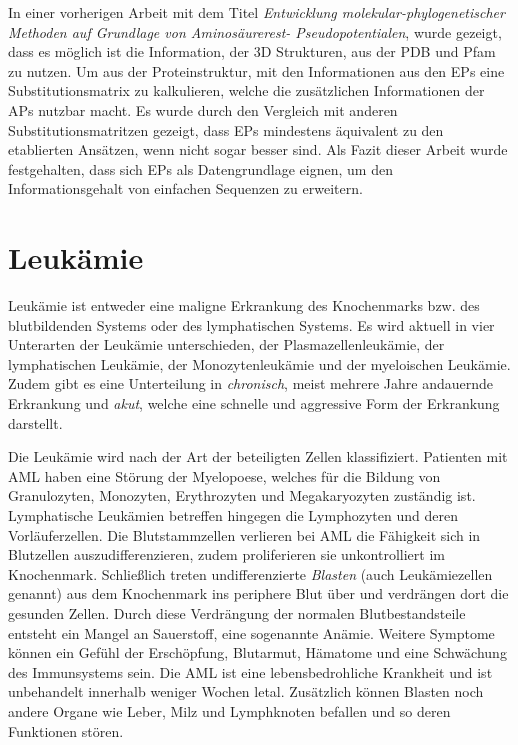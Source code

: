 In einer vorherigen Arbeit mit dem Titel \emph{Entwicklung mole\-kular-phylo\-genetisch\-er Methoden auf Grundlage von Aminosäurerest- Pseudopotentialen}, wurde gezeigt, dass es möglich ist die Information, der 3D Strukturen, aus der \ac{PDB} und \ac{Pfam} zu nutzen\cite{Mathias.2014}. Um aus der Proteinstruktur, mit den Informationen aus den EPs eine Substitutionsmatrix zu kalkulieren, welche die zusätzlichen Informationen der \ac{APs} nutzbar macht. Es wurde durch den Vergleich mit anderen Substitutionsmatritzen gezeigt, dass \ac{EP}s mindestens äquivalent zu den etablierten Ansätzen, wenn nicht sogar besser sind. Als Fazit dieser Arbeit wurde festgehalten, dass sich \ac{EP}s als Datengrundlage eignen, um den Informationsgehalt von einfachen Sequenzen zu erweitern.


\section{Leukämie}
Leukämie ist entweder eine maligne Erkrankung des Knochenmarks bzw. des blutbildenden Systems oder des lymphatischen Systems. Es wird aktuell in vier Unterarten der Leukämie unterschieden, der Plasmazellenleukämie, der lymphatischen Leukämie, der Monozytenleukämie und der myeloischen Leukämie. Zudem gibt es eine Unterteilung in \emph{chronisch}, meist mehrere Jahre andauernde Erkrankung und \emph{akut}, welche eine schnelle und aggressive Form der Erkrankung darstellt.

Die Leukämie wird nach der Art der beteiligten Zellen klassifiziert. Patienten mit \ac{AML} haben eine Störung der Myelopoese, welches für die Bildung von Granulozyten, Monozyten, Erythrozyten und Megakaryozyten zuständig ist. Lymphatische Leukämien betreffen hingegen die Lymphozyten und deren Vorläuferzellen. Die Blutstammzellen verlieren bei \ac{AML} die Fähigkeit sich in Blutzellen auszudifferenzieren, zudem proliferieren sie unkontrolliert im Knochenmark\cite{Papaemmanuil.2016}. Schließlich treten undifferenzierte \emph{Blasten} (auch Leukämiezellen genannt) aus dem Knochenmark ins periphere Blut über und verdrängen dort die gesunden Zellen. Durch diese Verdrängung der normalen Blutbestandsteile entsteht ein Mangel an Sauerstoff, eine sogenannte Anämie. Weitere Symptome können ein Gefühl der Erschöpfung, Blutarmut, Hämatome und eine Schwächung des Immunsystems sein. Die \ac{AML} ist eine lebensbedrohliche Krankheit und ist unbehandelt innerhalb weniger Wochen letal. Zusätzlich können Blasten noch andere Organe wie Leber, Milz und Lymphknoten befallen und so deren Funktionen stören.

